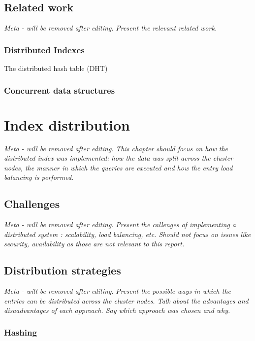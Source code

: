 \documentclass[11pt,a4paper]{globis-book}
\begin{document}
\section{Related work}
\label{sec:background-rw}

\textit{Meta - will be removed after editing.}
\textit{Present the relevant related work.}

\subsection{Distributed Indexes}

The distributed hash table (DHT)
\subsection{Concurrent data structures}

\chapter{Index distribution}
\label{ch:distindex}

\textit{Meta - will be removed after editing.}
\textit{This chapter should focus on how the distributed index was implemented: how the data was split across the cluster nodes, the manner in which the queries are executed and how the entry load balancing is performed.} 

\section{Challenges}
\label{sec:distindex-challenges}

\textit{Meta - will be removed after editing.}
\textit{Present the callenges of implementing a distributed system : scalability, load balancing, etc. Should not focus on issues like security, availability as those are not relevant to this report.}

\section{Distribution strategies}
\label{sec:distindex-strategies}

\textit{Meta - will be removed after editing.}
\textit{Present the possible ways in which the entries can be distributed across the cluster nodes. Talk about the advantages and disaadvantages of each approach. Say which approach was chosen and why.}

\subsection{Hashing}
\end{document}
